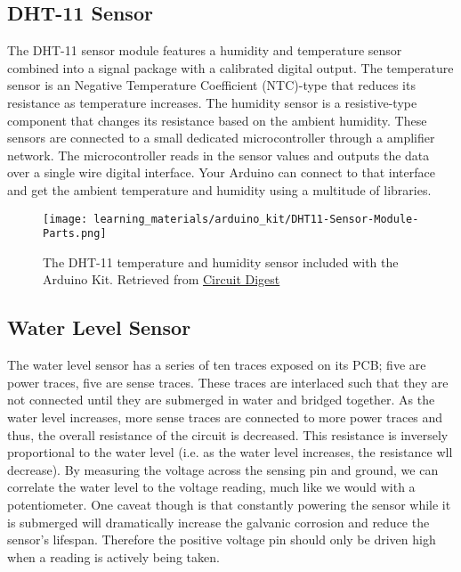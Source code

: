     \subsection*{DHT-11 Sensor}
    The DHT-11 sensor module features a humidity and temperature sensor combined into a signal package with a calibrated digital output.
    The temperature sensor is an Negative Temperature Coefficient (NTC)-type that reduces its resistance as temperature increases.
    The humidity sensor is a resistive-type component that changes its resistance based on the ambient humidity.
    These sensors are connected to a small dedicated microcontroller through a amplifier network.
    The microcontroller reads in the sensor values and outputs the data over a single wire digital interface.
    Your Arduino can connect to that interface and get the ambient temperature and humidity using a multitude of libraries.
    
    \begin{figure}[h!]
        \texttt{[image: learning\_materials/arduino\_kit/DHT11-Sensor-Module-Parts.png]}
        \caption[DHT-11 Sensor]{The DHT-11 temperature and humidity sensor included with the Arduino Kit. 
        Retrieved from \href{https://circuitdigest.com/sites/default/files/inlineimages/u4/DHT11-Sensor-Module-Parts.png}
        {Circuit Digest}}
    \end{figure}

    \subsection*{Water Level Sensor}
    The water level sensor has a series of ten traces exposed on its PCB; five are power traces, five are sense traces.
    These traces are interlaced such that they are not connected until they are submerged in water and bridged together.
    As the water level increases, more sense traces are connected to more power traces and thus, the overall resistance of the circuit is decreased.
    This resistance is inversely proportional to the water level (i.e. as the water level increases, the resistance wll decrease).
    By measuring the voltage across the sensing pin and ground, we can correlate the water level to the voltage reading, much like we would with a potentiometer.
    One caveat though is that constantly powering the sensor while it is submerged will dramatically increase the galvanic corrosion and reduce the sensor's lifespan.
    Therefore the positive voltage pin should only be driven high when a reading is actively being taken.

